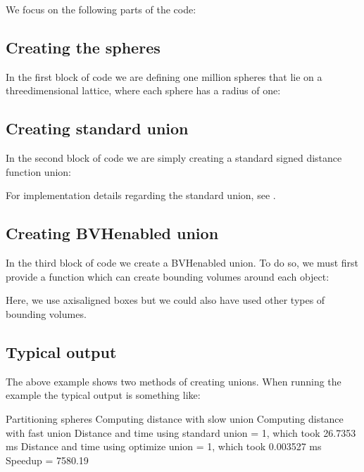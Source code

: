 \documentclass[letterpaper,10pt,english]{sphinxmanual}
\begin{document}
\sphinxAtStartPar
We focus on the following parts of the code:


\subsection{Creating the spheres}
\label{\detokenize{Example_Union:creating-the-spheres}}
\sphinxAtStartPar
In the first block of code we are defining one million spheres that lie on a three\sphinxhyphen{}dimensional lattice, where each sphere has a radius of one:


\subsection{Creating standard union}
\label{\detokenize{Example_Union:creating-standard-union}}
\sphinxAtStartPar
In the second block of code we are simply creating a standard signed distance function union:

\sphinxAtStartPar
For implementation details regarding the standard union, see {\hyperref[\detokenize{ImplemUnion:chap-union}]{}}.


\subsection{Creating BVH\sphinxhyphen{}enabled union}
\label{\detokenize{Example_Union:creating-bvh-enabled-union}}
\sphinxAtStartPar
In the third block of code we create a BVH\sphinxhyphen{}enabled union.
To do so, we must first provide a function which can create bounding volumes around each object:

\sphinxAtStartPar
Here, we use axis\sphinxhyphen{}aligned boxes but we could also have used other types of bounding volumes.


\subsection{Typical output}
\label{\detokenize{Example_Union:typical-output}}
\sphinxAtStartPar
The above example shows two methods of creating unions.
When running the example the typical output is something like:

\begin{sphinxVerbatim}[commandchars=\\\{\}]
Partitioning spheres
Computing distance with slow union
Computing distance with fast union
Distance and time using standard union = \PYGZhy{}1, which took 26.7353 ms
Distance and time using optimize union = \PYGZhy{}1, which took 0.003527 ms
Speedup = 7580.19
\end{sphinxVerbatim}
\end{document}
